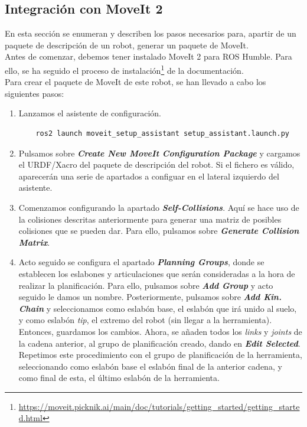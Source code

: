 \newpage
\subsection{Integración con MoveIt 2}
\noindent En esta sección se enumeran y describen los pasos necesarios para, apartir de un paquete de descripción de un robot, generar 
un paquete de MoveIt.
\\
Antes de comenzar, debemos tener instalado MoveIt 2 para ROS Humble. Para ello, se ha seguido el proceso de 
instalación\footnote{\url{https://moveit.picknik.ai/main/doc/tutorials/getting_started/getting_started.html}} de la documentación.
\\

Para crear el paquete de MoveIt de este robot, se han llevado a cabo los siguientes pasos:
\begin{enumerate}
\item Lanzamos el asistente de configuración.
\begin{verbatim}
    ros2 launch moveit_setup_assistant setup_assistant.launch.py
\end{verbatim}
\item Pulsamos sobre \textbf{\textit{\guillemotleft Create New MoveIt Configuration Package\guillemotright}} y cargamos el URDF/Xacro del paquete de descripción 
del robot. Si el fichero es válido, aparecerán una serie de apartados a configuar en el lateral izquierdo del asistente. 
\item Comenzamos configurando la apartado \textbf{\textit{\guillemotleft Self-Collisions\guillemotright}}. Aquí se hace uso de la colisiones 
descritas anteriormente para generar una matriz de posibles colisiones que se pueden dar. Para ello, pulsamos sobre
\textbf{\textit{\guillemotleft Generate Collision Matrix\guillemotright}}.
\item Acto seguido se configura el apartado \textbf{\textit{\guillemotleft Planning Groups\guillemotright}}, donde se establecen los eslabones y articulaciones que serán consideradas 
a la hora de realizar la planificación. Para ello, pulsamos sobre \textbf{\textit{\guillemotleft Add Group\guillemotright}} y acto seguido 
le damos un nombre. Posteriormente, pulsamos sobre \textbf{\textit{\guillemotleft Add Kin. Chain\guillemotright}} y seleccionamos como 
eslabón base, el eslabón que irá unido al suelo, y como eslabón \textit{tip}, el extremo del robot (sin llegar a la herramienta). Entonces, guardamos los cambios. Ahora, 
se añaden todos los \textit{links} y \textit{joints} de la cadena anterior, al grupo de planificación creado, dando en \textbf{\textit{\guillemotleft Edit Selected\guillemotright}}.
Repetimos este procedimiento con el grupo de planificación de la herramienta, seleccionando como eslabón base el eslabón final de la anterior cadena, y como 
final de esta, el último eslabón de la herramienta. 


\end{enumerate}
